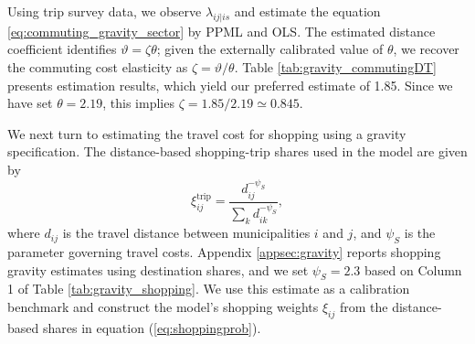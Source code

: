 \documentclass[12pt, unicode, a4paper]{article}
\newcommand{\1}{\mbox{1}\hspace{-0.25em}\mbox{l}} %
\begin{document}

Using trip survey data, we observe $\lambda_{ij|is}$ and estimate the equation \eqref{eq:commuting_gravity_sector} by PPML and OLS. The estimated distance coefficient identifies $\vartheta=\zeta\theta$; given the externally calibrated value of $\theta$, we recover the commuting cost elasticity as $\zeta=\vartheta/\theta$. Table \ref{tab:gravity_commutingDT} presents estimation results, which yield our preferred estimate of 1.85. Since we have set $\theta=2.19$, this implies $\zeta=1.85/2.19\simeq0.845$.

We next turn to estimating the travel cost for shopping using a gravity specification. The distance-based shopping-trip shares used in the model are given by
\begin{equation}
\label{eq:shoppingprob}
    \xi_{ij}^{\mathrm{trip}} = \frac{d_{ij}^{-\psi_S}}{ \sum_k d_{ik}^{-\psi_S}} ,
\end{equation}
where $d_{ij}$ is the travel distance between municipalities $i$ and $j$, and $\psi_S$ is the parameter governing travel costs.
Appendix \ref{appsec:gravity} reports shopping gravity estimates using destination shares, and we set $\psi_S=2.3$ based on Column 1 of Table \ref{tab:gravity_shopping}. We use this estimate as a calibration benchmark and construct the model's shopping weights $\xi_{ij}$ from the distance-based shares in equation (\ref{eq:shoppingprob}).
\end{document}
